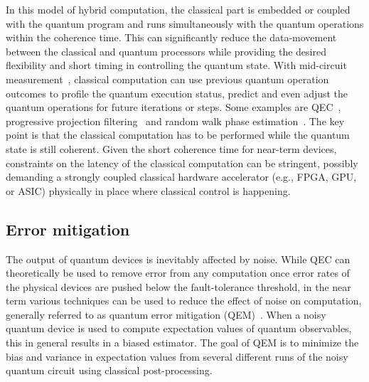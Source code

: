 In this model of hybrid computation, the classical part is embedded or coupled with the quantum program and runs simultaneously with the quantum operations within the coherence time.
This can significantly reduce the data-movement between the classical and quantum processors while providing the desired flexibility and short timing in controlling the quantum state.
With mid-circuit measurement~\cite{corcoles2021exploiting, govia2022randomized}, classical computation can use previous quantum operation outcomes to profile the quantum execution status, predict and even adjust the quantum operations for future iterations or steps.
Some examples are QEC~\cite{brown2023advances}, progressive projection filtering~\cite{ge2019faster, stetcu2023projection} and random walk phase estimation~\cite{granade2022using}.
The key point is that the classical computation has to be performed while the quantum state is still coherent.
Given the short coherence time for near-term devices, constraints on the latency of the classical computation can be stringent, possibly demanding a strongly coupled classical hardware accelerator (e.g., FPGA, GPU, or ASIC) physically in place where classical control is happening.

\subsection{Error mitigation}

The output of quantum devices is inevitably affected by noise. While QEC can theoretically be used to remove error from any computation once error rates of the physical devices are pushed below the fault-tolerance threshold, in the near term various techniques can be used to reduce the effect of noise on computation, generally referred to as quantum error mitigation (QEM)~\cite{kandala2019errormitigation,maksymov2023enhancing,cai2023quantum, stein2023q}. When a noisy quantum device is used to compute expectation values of quantum observables, this in general results in a biased estimator. The goal of QEM is to minimize the bias and variance in expectation values from several different runs of the noisy quantum circuit using classical post-processing.

